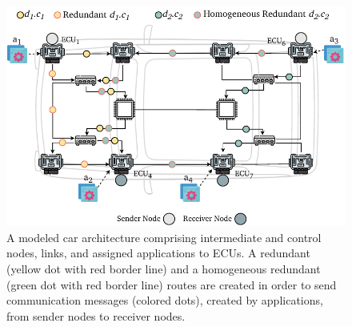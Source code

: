     
     
        \begin{figure}[t]
    	\centering
    	\includegraphics[width=1\columnwidth]{figures/hr_routing.pdf}
    	\caption{A modeled car architecture comprising intermediate and control nodes, links, and assigned applications to ECUs. A redundant (yellow dot with red border line) and a homogeneous redundant (green dot with red border line) routes are created in order to send communication messages (colored dots), created by applications, from sender nodes to receiver nodes.  
    	}
    	\label{routing_rh}
    \end{figure}
    
